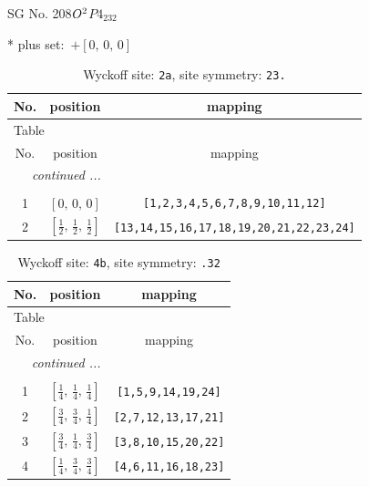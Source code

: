 \documentclass[fleqn,8pt]{jsarticle}
\begin{document}
\setcounter{MaxMatrixCols}{32}

\renewcommand{\tablename}{Table~}
\renewcommand{\figurename}{Figure~}
\begin{center}
\LARGE
SG No. 208\quad$O_{\rm }^{2}$\quad$P4_232$\quad[ cubic ]
\end{center}
* plus set:\,\,\,$+\left[ 0,\, 0,\, 0 \right]$
\renewcommand{\arraystretch}{1.2}
\begin{longtable}{ccc}
\caption{Wyckoff site: {\tt 2a}, site symmetry: {\tt 23.}}
 \\
 \hline \hline
No. & position & mapping \\ \hline \endfirsthead

\multicolumn{2}{l}{\tablename\ \thetable{}} \\
 \hline \hline
No. & position & mapping \\ \hline \endhead

 \hline \hline
\multicolumn{2}{r}{\footnotesize\it continued ...} \\ \endfoot

 \hline \hline
\multicolumn{2}{r}{} \\ \endlastfoot

1 & $\left[ 0,\, 0,\, 0 \right]$ & {\tt [1,2,3,4,5,6,7,8,9,10,11,12]} \\ \hline
2 & $\left[ \frac{1}{2},\, \frac{1}{2},\, \frac{1}{2} \right]$ & {\tt [13,14,15,16,17,18,19,20,21,22,23,24]} \\
\end{longtable}
\renewcommand{\arraystretch}{1.2}
\begin{longtable}{ccc}
\caption{Wyckoff site: {\tt 4b}, site symmetry: {\tt .32}}
 \\
 \hline \hline
No. & position & mapping \\ \hline \endfirsthead

\multicolumn{2}{l}{\tablename\ \thetable{}} \\
 \hline \hline
No. & position & mapping \\ \hline \endhead

 \hline \hline
\multicolumn{2}{r}{\footnotesize\it continued ...} \\ \endfoot

 \hline \hline
\multicolumn{2}{r}{} \\ \endlastfoot

1 & $\left[ \frac{1}{4},\, \frac{1}{4},\, \frac{1}{4} \right]$ & {\tt [1,5,9,14,19,24]} \\ \hline
2 & $\left[ \frac{3}{4},\, \frac{3}{4},\, \frac{1}{4} \right]$ & {\tt [2,7,12,13,17,21]} \\ \hline
3 & $\left[ \frac{3}{4},\, \frac{1}{4},\, \frac{3}{4} \right]$ & {\tt [3,8,10,15,20,22]} \\ \hline
4 & $\left[ \frac{1}{4},\, \frac{3}{4},\, \frac{3}{4} \right]$ & {\tt [4,6,11,16,18,23]} \\
\end{longtable}
\end{document}
